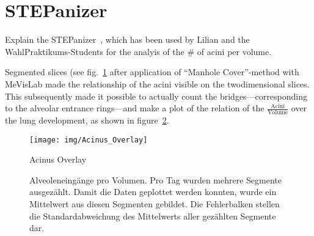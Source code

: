 \section{STEPanizer}
Explain the STEPanizer~\cite{Tschanz2010}, which has been used by Lilian and the WahlPraktikums-Students for the analyis of the \# of acini per volume.

Segmented slices (see fig.~\ref{fig:acinus overlay} after application of ``Manhole Cover''-method with MeVisLab made the relationship of the acini visible on the twodimensional slices. This subsequently made it possible to actually count the bridges---corresponding to the alveolar entrance rings---and make a plot of the relation of the $\frac{\textrm{Acini}}{\textrm{Volume}}$ over the lung development, as shown in figure~\ref{fig:plot}.

\renewcommand{\imsize}{0.618\linewidth}
\begin{figure}
	\centering
	\texttt{[image: img/Acinus\_Overlay]}
	\caption{Acinus Overlay}
	\label{fig:acinus overlay}
\end{figure}

\begin{figure}[htb]
	\noindent{}
	\caption{Alveoleneingänge pro Volumen. Pro Tag wurden mehrere Segmente ausgezählt. Damit die Daten geplottet werden konnten, wurde ein Mittelwert aus diesen Segmenten gebildet. Die Fehlerbalken stellen die Standardabweichung des Mittelwerts aller gezählten Segmente dar.}
	\label{fig:plot}
\end{figure}